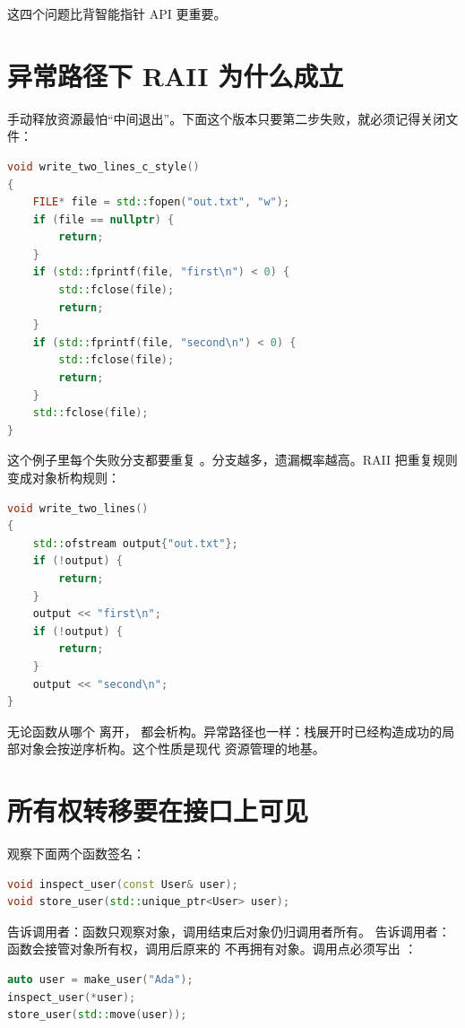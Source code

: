 这四个问题比背智能指针 API 更重要。

\section{异常路径下 RAII 为什么成立}

手动释放资源最怕“中间退出”。下面这个版本只要第二步失败，就必须记得关闭文件：

\begin{lstlisting}[language=C++,caption={多出口函数里的手动清理压力}]
void write_two_lines_c_style()
{
    FILE* file = std::fopen("out.txt", "w");
    if (file == nullptr) {
        return;
    }
    if (std::fprintf(file, "first\n") < 0) {
        std::fclose(file);
        return;
    }
    if (std::fprintf(file, "second\n") < 0) {
        std::fclose(file);
        return;
    }
    std::fclose(file);
}
\end{lstlisting}

这个例子里每个失败分支都要重复 。分支越多，遗漏概率越高。RAII 把重复规则变成对象析构规则：

\begin{lstlisting}[language=C++,caption={RAII 让退出路径统一}]
void write_two_lines()
{
    std::ofstream output{"out.txt"};
    if (!output) {
        return;
    }
    output << "first\n";
    if (!output) {
        return;
    }
    output << "second\n";
}
\end{lstlisting}

无论函数从哪个  离开， 都会析构。异常路径也一样：栈展开时已经构造成功的局部对象会按逆序析构。这个性质是现代 \cpp 资源管理的地基。

\section{所有权转移要在接口上可见}

观察下面两个函数签名：

\begin{lstlisting}[language=C++,caption={签名暴露所有权语义}]
void inspect_user(const User& user);
void store_user(std::unique_ptr<User> user);
\end{lstlisting}

 告诉调用者：函数只观察对象，调用结束后对象仍归调用者所有。 告诉调用者：函数会接管对象所有权，调用后原来的  不再拥有对象。调用点必须写出 ：

\begin{lstlisting}[language=C++,caption={调用点显式转移所有权}]
auto user = make_user("Ada");
inspect_user(*user);
store_user(std::move(user));
\end{lstlisting}

